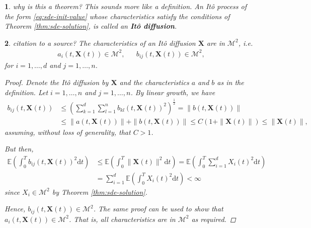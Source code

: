 \documentclass[english]{article}
\newcommand{\comment}[1]{\color{blue}#1\color{black}}
\numberwithin{equation}{section}
\numberwithin{figure}{section}
\theoremstyle{bolddescit}
\newtheorem{theorem}{\protect\theoremname}[section]
\theoremstyle{definition}
\theoremstyle{definition}
\theoremstyle{plain}
\newtheorem{lemma}[theorem]{\protect\lemmaname}
\theoremstyle{plain}
\theoremstyle{bolddesc}
\theoremstyle{plain}
\theoremstyle{remark}
\providecommand{\lemmaname}{Lemma}
\providecommand{\theoremname}{Theorem}
\begin{document}
\begin{theorem}
\comment{why is this a theorem? This sounds more like a definition.}
  An It\^o process of the form \eqref{eq:sde-init-value} whose characteristics satisfy the conditions of Theorem \ref{thm:sde-solution}, is called an \textbf{It\^o diffusion}.
\end{theorem}

\begin{lemma}\label{lem:ito-diffusion-characteristics-m2}
\comment{citation to a source?}
  The characteristics of an It\^o diffusion $\mathbf{X}$ are in $\mathcal{M}^2$, i.e.
  \begin{align*}
    a_i(t,\mathbf{X}(t)) \in \mathcal{M}^2, &&
    b_{ij}(t,\mathbf{X}(t)) \in \mathcal{M}^2,
  \end{align*}
  for $i=1,\ldots,d$ and $j=1,\ldots,n$.

  \begin{proof}
    Denote the It\^o diffusion by $\mathbf{X}$ and the characteristics $a$ and $b$ as in the definition. Let $i=1,\ldots,n$ and $j=1,\ldots,n$. By linear growth, we have
    \begin{align*}
      b_{ij}(t,\mathbf{X}(t))
      &\le \left( \sum_{k=1}^d \sum_{l=1}^n b_{kl}(t,\mathbf{X}(t))^2 \right)^{\frac{1}{2}}
      = \|b(t,\mathbf{X}(t))\|\\
      &\le \|a(t,\mathbf{X}(t))\| + \|b(t,\mathbf{X}(t))\|
      \le C (1 + \|\mathbf{X}(t)\|)
      \le \|\mathbf{X}(t)\|,
    \end{align*}
    assuming, without loss of generality, that $C > 1$.

    But then,
    \begin{align*}
      \mathbb{E} \left( \int_0^T b_{ij}(t,\mathbf{X}(t))^2 \mathrm{d}t \right)
      &\le \mathbb{E} \left( \int_0^T \|\mathbf{X}(t)\|^2 \mathrm{d}t \right)
      = \mathbb{E} \left( \int_0^T \sum_{i=1}^d X_i(t)^2 \mathrm{d}t \right)\\
      &= \sum_{i=1}^d \mathbb{E} \left( \int_0^T X_i(t)^2 \mathrm{d}t \right) < \infty \tag{linearity}
    \end{align*}
    since $X_i \in \mathcal{M}^2$ by Theorem \ref{thm:sde-solution}.

    Hence, $b_{ij}(t,\mathbf{X}(t)) \in \mathcal{M}^2$. The same proof can be used to show that $a_i(t,\mathbf{X}(t)) \in \mathcal{M}^2$. That is, all characteristics are in $\mathcal{M}^2$ as required.
  \end{proof}
\end{lemma}
\end{document}

